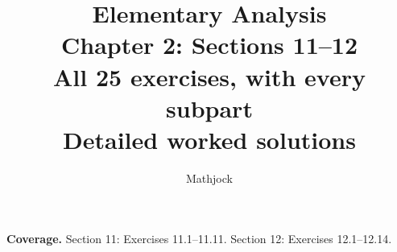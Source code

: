 
\title{\textbf{Elementary Analysis}\\[0.3em]
Chapter 2: Sections 11--12\\[0.4em]
\large All 25 exercises, with every subpart\\
Detailed worked solutions}
\author{Mathjock}
\date{}

\maketitle
\bookinfo
\par\textbf{Coverage.} Section 11: Exercises 11.1--11.11. Section 12: Exercises 12.1--12.14.
\tableofcontents
\clearpage
\setcounter{section}{10}

\clearpage


